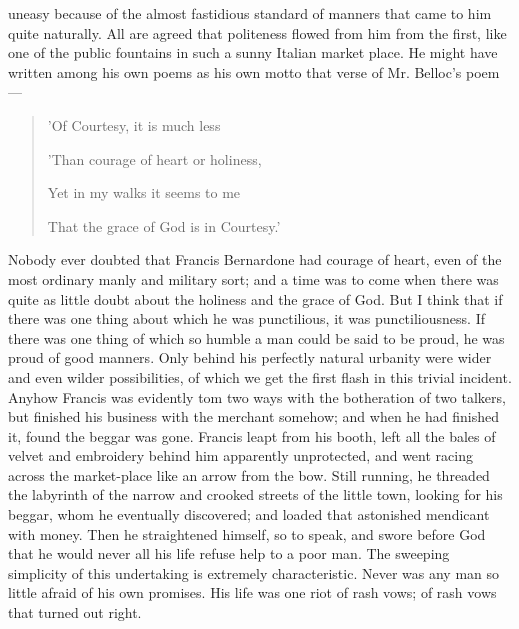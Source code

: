\documentclass{book}
\begin{document}
uneasy because of the almost fastidious standard of manners that came to him quite naturally. All are agreed that politeness flowed from him from the first, like one of the public fountains in such a sunny Italian market place. He might have written among his own poems as his own motto that verse of Mr. Belloc’s poem—

\begin{quotation}
	’Of Courtesy, it is much less

	’Than courage of heart or holiness,

	Yet in my walks it seems to me

	That the grace of God is in Courtesy.’
\end{quotation}

Nobody ever doubted that Francis Bernardone had courage of heart, even of the most ordinary manly and military sort; and a time was to come when there was quite as little doubt about the holiness and the grace of God. But I think that if there was one thing about which he was punctilious, it was punctiliousness. If there was one thing of which so humble a man could be said to be proud, he was proud of good manners. Only behind his perfectly natural urbanity were wider and even wilder possibilities, of which we get the first flash in this trivial incident. Anyhow Francis was evidently tom two ways with the botheration of two talkers, but finished his business with the merchant somehow; and when he had finished it, found the beggar was gone. Francis leapt from his booth, left all the bales of velvet and embroidery behind him apparently unprotected, and went racing across the market-place like an arrow from the bow. Still running, he threaded the labyrinth of the narrow and crooked streets of the little town, looking for his beggar, whom he eventually discovered; and loaded that astonished mendicant with money. Then he straightened himself, so to speak, and swore before God that he would never all his life refuse help to a poor man. The sweeping simplicity of this undertaking is extremely characteristic. Never was any man so little afraid of his own promises. His life was one riot of rash vows; of rash vows that turned out right.
\end{document}
